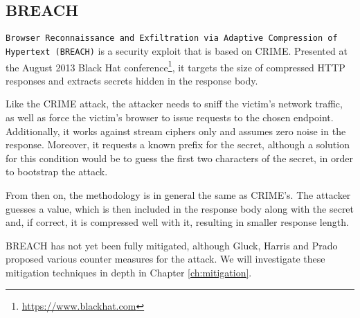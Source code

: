 \subsection{BREACH}

\texttt{Browser Reconnaissance and Exfiltration via Adaptive Compression of
Hypertext (BREACH)} \cite{breach} is a security exploit that is based on CRIME.
Presented at the August 2013 Black Hat
conference\footnote{\url{https://www.blackhat.com}}, it targets the size of
compressed HTTP responses and extracts secrets hidden in the response body.

Like the CRIME attack, the attacker needs to sniff the victim's network traffic,
as well as force the victim's browser to issue requests to the chosen endpoint.
Additionally, it works against stream ciphers only and assumes zero noise in the
response. Moreover, it requests a known prefix for the secret, although a
solution for this condition would be to guess the first two characters of the
secret, in order to bootstrap the attack.

From then on, the methodology is in general the same as CRIME's. The attacker
guesses a value, which is then included in the response body along with the
secret and, if correct, it is compressed well with it, resulting in smaller
response length.

BREACH has not yet been fully mitigated, although Gluck, Harris and Prado
proposed various counter measures for the attack. We will investigate these
mitigation techniques in depth in Chapter \ref{ch:mitigation}.
